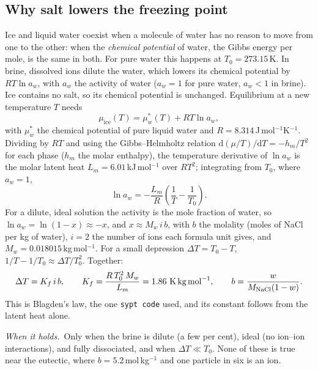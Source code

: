 \documentclass[11pt,a4paper]{article}
\newcommand{\code}[1]{\texttt{#1}}
\newcommand{\holds}{\par\noindent\textit{When it holds.}\ }
\begin{document}
\subsection{Why salt lowers the freezing point}
\label{sec:colligative}
Ice and liquid water coexist when a molecule of water has no reason to move from one to the other:
when the \emph{chemical potential} of water, the Gibbs energy per mole, is the same in both. For pure
water this happens at $T_0 = 273.15$\,K. In brine, dissolved ions dilute the water, which lowers its
chemical potential by $RT\ln a_w$, with $a_w$ the activity of water ($a_w = 1$ for pure water,
$a_w < 1$ in brine). Ice contains no salt, so its chemical potential is unchanged. Equilibrium at a
new temperature $T$ needs
\begin{equation}
\mu_{\text{ice}}(T) = \mu^{*}_{w}(T) + RT\ln a_w ,
\label{eq:mu}
\end{equation}
with $\mu^*_w$ the chemical potential of pure liquid water and $R = 8.314$\,J\,mol$^{-1}$K$^{-1}$.
Dividing by $RT$ and using the Gibbs–Helmholtz relation $\mathrm d(\mu/T)/\mathrm dT = -h_m/T^2$
for each phase ($h_m$ the molar enthalpy), the temperature derivative of $\ln a_w$ is the molar latent
heat $L_m = 6.01$\,kJ\,mol$^{-1}$ over $RT^2$; integrating from $T_0$, where $a_w = 1$,
\begin{equation}
\ln a_w = -\frac{L_m}{R}\left(\frac{1}{T} - \frac{1}{T_0}\right) .
\label{eq:lnaw}
\end{equation}
For a dilute, ideal solution the activity is the mole fraction of water, so
$\ln a_w = \ln(1 - x) \approx -x$, and $x \approx M_w\, i\, b$, with $b$ the molality (moles of NaCl per
kg of water), $i = 2$ the number of ions each formula unit gives, and $M_w = 0.018015$\,kg\,mol$^{-1}$.
For a small depression $\Delta T = T_0 - T$, $1/T - 1/T_0 \approx \Delta T/T_0^2$. Together:
\begin{equation}
\Delta T = K_f\, i\, b,\qquad K_f = \frac{R\,T_0^2\,M_w}{L_m} = 1.86\ \text{K\,kg\,mol}^{-1},
\qquad b = \frac{w}{M_{\text{NaCl}}(1 - w)} .
\label{eq:blagden}
\end{equation}
This is Blagden's law, the one \code{sypt code} used, and its constant follows from the latent heat
alone.
\holds Only when the brine is dilute (a few per cent), ideal (no ion–ion interactions), and fully
dissociated, and when $\Delta T \ll T_0$. None of these is true near the eutectic, where
$b = 5.2$\,mol\,kg$^{-1}$ and one particle in six is an ion.
\end{document}
